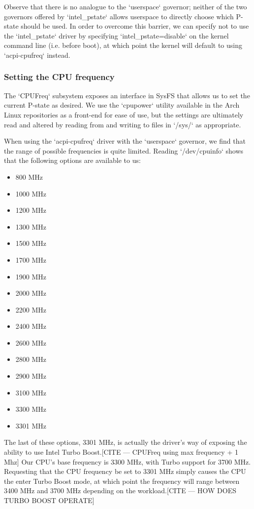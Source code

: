 Observe that there is no analogue to the `userspace` governor; neither of the
two governors offered by `intel\_pstate` allows userspace to directly choose
which P-state should be used. In order to overcome this barrier, we can specify
not to use the `intel\_pstate` driver by specifying `intel\_pstate=disable` on
the kernel command line (i.e. before boot), at which point the kernel will
default to using `acpi-cpufreq` instead.

\subsubsection{Setting the CPU frequency}

The `CPUFreq` subsystem exposes an interface in SysFS that allows us to set the
current P-state as desired. We use the `cpupower` utility available in the Arch
Linux repositories as a front-end for ease of use, but the settings are
ultimately read and altered by reading from and writing to files in `/sys/` as
appropriate.

When using the `acpi-cpufreq` driver with the `userspace` governor, we find that
the range of possible frequencies is quite limited. Reading `/dev/cpuinfo` shows
that the following options are available to us:
\begin{itemize}
    \item 800 MHz
    \item 1000 MHz
    \item 1200 MHz
    \item 1300 MHz
    \item 1500 MHz
    \item 1700 MHz
    \item 1900 MHz
    \item 2000 MHz
    \item 2200 MHz
    \item 2400 MHz
    \item 2600 MHz
    \item 2800 MHz
    \item 2900 MHz
    \item 3100 MHz
    \item 3300 MHz
    \item 3301 MHz
\end{itemize}

The last of these options, 3301 MHz, is actually the driver's way of exposing
the ability to use Intel Turbo Boost.[CITE — CPUFreq using max frequency + 1 Mhz]
Our CPU's base frequency is 3300 MHz,
with Turbo support for 3700 MHz. Requesting that the CPU frequency be set to
3301 MHz simply causes the CPU the enter Turbo Boost mode, at which point the
frequency will range between 3400 MHz and 3700 MHz depending on the
workload.[CITE — HOW DOES TURBO BOOST OPERATE]
